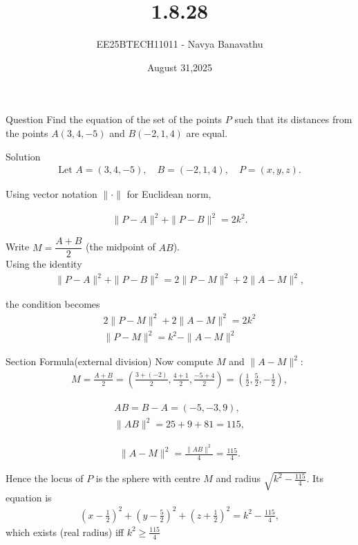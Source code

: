 \documentclass{beamer}
\title{1.8.28}
\date{August 31,2025}
\author{EE25BTECH11011 - Navya Banavathu}
\begin{document}
\frame{\titlepage}

\begin{frame}{Question}
Find the equation of the set of the points $P$ such that its distances 
from the points $A(3,4,-5)$ and $B(-2,1,4)$ are equal.\\
\end{frame}

\begin{frame}{Solution}
\begin{align}
\text{Let }A=(3,4,-5),\quad B=(-2,1,4),\quad P=(x,y,z).
\end{align}

Using vector notation $\|\cdot\|$ for Euclidean norm,

\begin{align}
\|P-A\|^2+\|P-B\|^2=2k^2.
\end{align}

Write $M=\dfrac{A+B}{2}$ (the midpoint of $AB$).\\

Using the identity
\begin{align}
\|P-A\|^2+\|P-B\|^2=2\|P-M\|^2+2\|A-M\|^2,
\end{align}

the condition becomes
\begin{align}
2\|P-M\|^2+2\|A-M\|^2=2k^2\\
\|P-M\|^2=k^2-\|A-M\|^2
\end{align}
\end{frame}

\begin{frame}{Section Formula(external division)}
Now compute $M$ and $\|A-M\|^2$:
\begin{align}
M=\frac{A+B}{2}=\left(\frac{3+(-2)}{2},\frac{4+1}{2},\frac{-5+4}{2}\right)
=\left(\frac{1}{2},\frac{5}{2},-\frac{1}{2}\right),
\end{align}

\begin{align}
AB=B-A=(-5,-3,9),\\
\|AB\|^2=25+9+81=115,
\end{align}

\begin{align}
\|A-M\|^2=\frac{\|AB\|^2}{4}=\frac{115}{4}.
\end{align}

Hence the locus of $P$ is the sphere with centre $M$ and radius
$\sqrt{k^2-\tfrac{115}{4}}$. Its equation is
\begin{align}
\left(x-\tfrac12\right)^2+\left(y-\tfrac52\right)^2+\left(z+\tfrac12\right)^2
= k^2-\frac{115}{4},
\end{align}
which exists (real radius) iff $k^2\ge\frac{115}{4}$
\end{frame}
\end{document}

